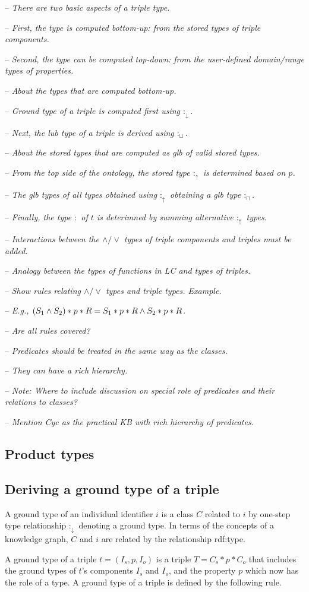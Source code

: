 \documentclass[runningheads]{llncs}
\newcommand{\darr}{\downarrow}
\newcommand{\uarr}{\uparrow}
\newcommand{\notes}[1]{\noindent\begin{small}-- \emph{#1}\\\end{small}}
\begin{document}
\notes{There are two basic aspects of a triple type.}
\notes{First, the type is computed bottom-up: from the stored types of triple components.}
\notes{Second, the type can be computed top-down: from the user-defined domain/range types of properties.}

\notes{About the types that are computed bottom-up.}
\notes{Ground type of a triple is computed first using $:_\darr$.}
\notes{Next, the lub type of a triple is derived using $:_\sqcup$.}

\notes{About the stored types that are computed as glb of valid stored types.}
\notes{From the top side of the ontology, the stored type $:_\uarr$ is determined based on $p$.}
\notes{The glb types of all types obtained using $:_\uarr$ obtaining a glb type $:_\sqcap$.}
\notes{Finally, the type $:$ of $t$ is deterimned by summing alternative $:_\uarr$ types.}

\notes{Interactions between the $\land/\lor$ types of triple components and triples must be added.}
\notes{Analogy between the types of functions in LC and types of triples.}
\notes{Show rules relating $\land/\lor$ types and triple types. Example.}
\notes{E.g., $(S_1\land\/S_2)*p*R = S_1*p*R\land\/S_2*p*R$.}
\notes{Are all rules covered?}

\notes{Predicates should be treated in the same way as the classes.}
\notes{They can have a rich hierarchy.}
\notes{\emph{Note:} Where to include discussion on special role of predicates and their relations to classes?}
\notes{Mention Cyc as the practical KB with rich hierarchy of predicates.}



\subsection{Product types}



\subsection{Deriving a ground type of a triple\label{sec:3-ground-types}}

\noindent
A ground type of an individual identifier $i$ is a class $C$ related
to $i$ by one-step type relationship $:_\darr$ denoting a ground
type. In terms of the concepts of a knowledge graph, $C$ and $i$ are
related by the relationship rdf:type.

A ground type of a triple $t=(I_s,p,I_o)$ is a triple $T=C_s*p*C_o$ that
includes the ground types of $t$'s components $I_s$ and $I_o$, and the
property $p$ which now has the role of a type. A ground type of a
triple is defined by the following rule.
\end{document}
